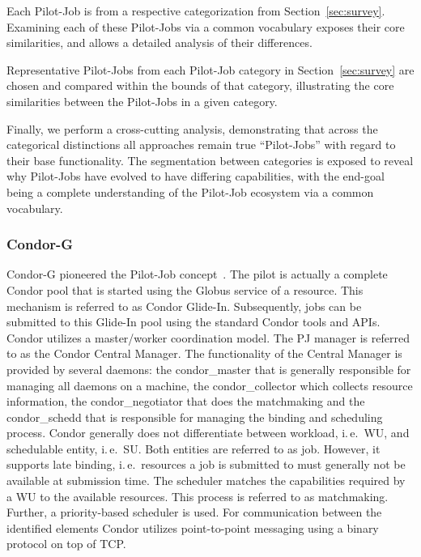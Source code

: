 \documentclass{sig-alternate}
\begin{document}
Each Pilot-Job is from
a respective categorization from Section~\ref{sec:survey}.
Examining each of these Pilot-Jobs via a common vocabulary
exposes their core similarities, and allows a detailed analysis
of their differences. 

Representative Pilot-Jobs from each Pilot-Job category
in Section~\ref{sec:survey} are chosen and compared within
the bounds of that category, illustrating the core similarities
between the Pilot-Jobs in a given category.


Finally, we perform
a cross-cutting analysis, demonstrating that across the categorical
distinctions all approaches remain true ``Pilot-Jobs'' with regard
to their base functionality.  The segmentation between categories
is exposed to reveal why Pilot-Jobs have evolved to have
differing capabilities, with the end-goal being a
complete understanding of the Pilot-Job ecosystem via a common
vocabulary.

\subsubsection{Condor-G}
Condor-G pioneered the Pilot-Job concept~\cite{condor-g}. The pilot is
actually a complete Condor pool that is started using the Globus
service of a resource. This mechanism is referred to as Condor
Glide-In. Subsequently, jobs can be submitted to this Glide-In pool
using the standard Condor tools and APIs. Condor utilizes a
master/worker coordination model. The PJ manager is referred to as the
Condor Central Manager. The functionality of the Central Manager is
provided by several daemons: the condor\_master that is generally
responsible for managing all daemons on a machine, the
condor\_collector which collects resource information, the
condor\_negotiator that does the matchmaking and the condor\_schedd
that is responsible for managing the binding and scheduling
process. Condor generally does not differentiate between workload,
i.\,e.\ WU, and schedulable entity, i.\,e.\ SU. Both entities are
referred to as job. However, it supports late binding, i.\,e.\
resources a job is submitted to must generally not be available at
submission time. The scheduler matches the capabilities required by a
WU to the available resources. This process is referred to as
matchmaking. Further, a priority-based scheduler is used. For
communication between the identified elements Condor utilizes
point-to-point messaging using a binary protocol on top of TCP.
\end{document}
